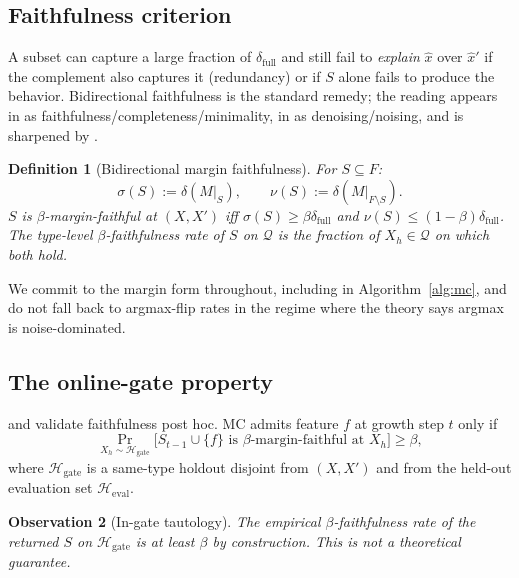 \documentclass[10pt]{article}
\newtheorem{definition}{Definition}[section]
\newtheorem{observation}[definition]{Observation}
\begin{document}
\subsection{Faithfulness criterion}

A subset can capture a large fraction of $\delta_{\text{full}}$ and still fail to \emph{explain} $\hat x$ over $\hat x'$ if the complement also captures it (redundancy) or if $S$ alone fails to produce the behavior. Bidirectional faithfulness is the standard remedy; the reading appears in \citet{wang2022interpretability} as faithfulness/completeness/minimality, in \citet{heimersheim2024patching} as denoising/noising, and is sharpened by \citet{hanna2024faithfulness}.

\begin{definition}[Bidirectional margin faithfulness]
\label{def:faithfulness}
For $S \subseteq F$:
\[
\sigma(S) := \delta(M|_S), \qquad \nu(S) := \delta(M|_{F \setminus S}).
\]
$S$ is \emph{$\beta$-margin-faithful} at $(X, X')$ iff $\sigma(S) \geq \beta\delta_{\text{full}}$ \emph{and} $\nu(S) \leq (1-\beta)\delta_{\text{full}}$. The \emph{type-level $\beta$-faithfulness rate} of $S$ on $\mathcal{Q}$ is the fraction of $X_h \in \mathcal{Q}$ on which both hold.
\end{definition}

We commit to the margin form throughout, including in Algorithm~\ref{alg:mc}, and do not fall back to argmax-flip rates in the regime where the theory says argmax is noise-dominated.

\subsection{The online-gate property}

\citet{marks2024sparse} and \citet{conmy2023acdc} validate faithfulness post hoc. MC admits feature $f$ at growth step $t$ only if
\[
\Pr_{X_h \sim \mathcal{H}_{\text{gate}}}\!\big[S_{t-1} \cup \{f\}\text{ is }\beta\text{-margin-faithful at }X_h\big] \geq \beta,
\]
where $\mathcal{H}_{\text{gate}}$ is a same-type holdout disjoint from $(X, X')$ and from the held-out evaluation set $\mathcal{H}_{\text{eval}}$.

\begin{observation}[In-gate tautology]
\label{obs:tautology}
The empirical $\beta$-faithfulness rate of the returned $S$ on $\mathcal{H}_{\text{gate}}$ is at least $\beta$ by construction. This is not a theoretical guarantee.
\end{observation}
\end{document}
